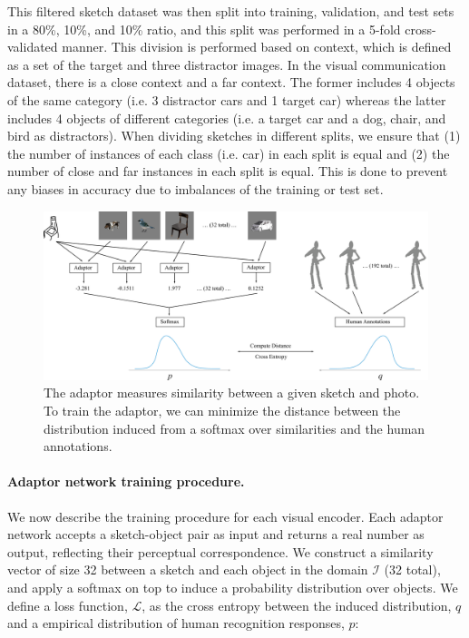 \documentclass[9pt,twocolumn,twoside]{pnas-new}
\begin{document}
{This filtered sketch dataset was then split into training, validation, and test sets in a 80\%, 10\%, and 10\% ratio, and this split was performed in a 5-fold cross-validated manner. This division is performed based on context, which is defined as a set of the target and three distractor images. In the visual communication dataset, there is a close context and a far context. The former includes 4 objects of the same category (i.e. 3 distractor cars and 1 target car) whereas the latter includes 4 objects of different categories (i.e. a target car and a dog, chair, and bird as distractors). When dividing sketches in different splits, we ensure that (1) the number of instances of each class (i.e. car) in each split is equal and (2) the number of close and far instances in each split is equal. This is done to prevent any biases in accuracy due to imbalances of the training or test set.

\begin{figure}[h!]
\centering
\includegraphics[width=0.95\columnwidth]{figures/adaptor_algorithm.pdf}
\caption{The adaptor measures similarity between a given sketch and photo. To train the adaptor, we can minimize the distance between the distribution induced from a softmax over similarities and the human annotations.}
\label{fig:adaptor_training}
\end{figure}

\paragraph{Adaptor network training procedure.}
We now describe the training procedure for each visual encoder. Each adaptor network accepts a sketch-object pair as input and returns a real number as output, reflecting their perceptual correspondence. We construct a similarity vector of size 32 between a sketch and each object in the domain $\mathcal{I}$ (32 total), and apply a softmax on top to induce a probability distribution over objects. We define a loss function, $\mathcal{L}$, as the cross entropy between the induced distribution, $q$ and a empirical distribution of human recognition responses, $p$:

}
\end{document}
